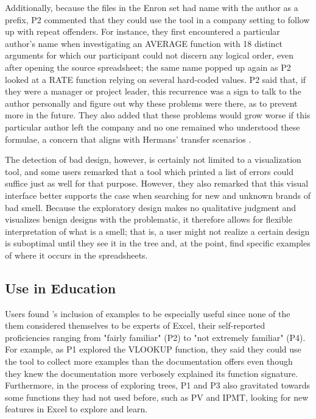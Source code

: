\documentclass[conference]{IEEEtran}
\begin{document}
	Additionally, because the files in the Enron set had name with the author
	as a prefix, P2 commented that they could use the tool in a company
	setting to follow up with repeat offenders. For instance, they first
	encountered a particular author's name when investigating an AVERAGE function
	with 18 distinct arguments for which our participant could not discern any
	logical order, even after opening the source spreadsheet; the same name
	popped up again as P2 looked at a RATE function relying on several hard-coded
	values. P2 said that, if they were a manager or project leader, this recurrence
	was a sign to talk to the author personally and figure out why
	these problems were there, as to prevent more in the future. They also added
	that these problems would grow worse if this particular author left the company
	and no one remained who understood these formulae, a concern that aligns with
	Hermans' transfer scenarios \cite{hermans2011supporting}.
	
	The detection of bad design, however, is certainly not limited to a
	visualization tool, and some users remarked that a tool which printed a list of
	errors could suffice just as well for that purpose. However, they also remarked
	that this visual interface better supports the case when searching for new and
	unknown brands of bad smell. Because the exploratory design makes no
	qualitative judgment and visualizes benign designs with the problematic, it
	therefore allows for flexible interpretation of what is a smell; that is, a
	user might not realize a certain design is suboptimal until they see it in the
	tree and, at the point, find specific examples of where it occurs in the
	spreadsheets.
	
	\subsection{Use in Education} Users found \toolname's inclusion of examples
	to be especially useful since none of the them considered themselves to be
	experts of Excel, their self-reported proficiencies ranging from "fairly
	familiar" (P2) to "not extremely familiar" (P4). For example, as P1 explored
	the VLOOKUP function, they said they could use the tool to collect more
	examples than the documentation offers even though they knew the documentation more verbosely
	explained its function signature. Furthermore, in the process of exploring trees,
	P1 and P3 also gravitated towards some functions they had not used before, such as
	PV and IPMT, looking for new features in Excel to explore and learn. \par
	
\end{document}
